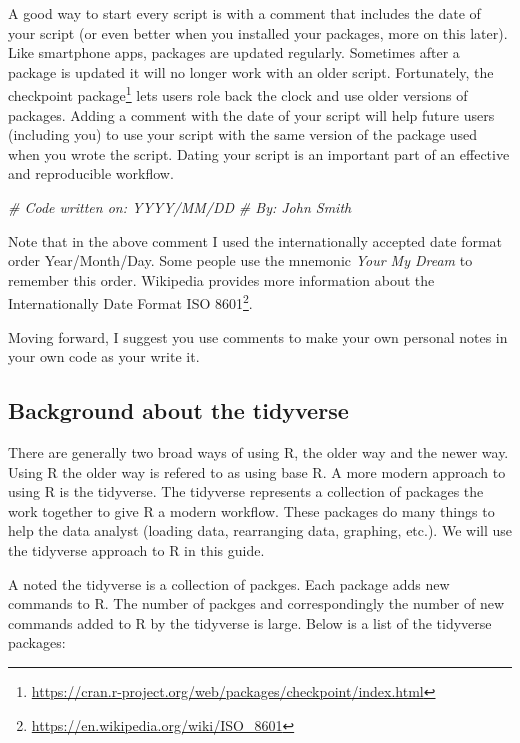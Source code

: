 \documentclass[
]{krantz}
\makeatletter
\newenvironment{Shaded}{\begin{snugshade}}{\end{snugshade}}
\newcommand{\CommentTok}[1]{\textcolor[rgb]{0.37,0.37,0.37}{\textit{#1}}}
\renewcommand{\href}[2]{#2\footnote{\url{#1}}}
\newenvironment{kframe}{%
\medskip{}
\setlength{\fboxsep}{.8em}
 \def\at@end@of@kframe{}%
 \ifinner\ifhmode%
  \def\at@end@of@kframe{\end{minipage}}%
  \begin{minipage}{\columnwidth}%
 \fi\fi%
 \def\FrameCommand##1{\hskip\@totalleftmargin \hskip-\fboxsep
 \colorbox{shadecolor}{##1}\hskip-\fboxsep
     \hskip-\linewidth \hskip-\@totalleftmargin \hskip\columnwidth}%
 \MakeFramed {\advance\hsize-\width
   \@totalleftmargin\z@ \linewidth\hsize
   \@setminipage}}%
 {\par\unskip\endMakeFramed%
 \at@end@of@kframe}
\renewenvironment{Shaded}{\begin{kframe}}{\end{kframe}}
\makeatother
\begin{document}
A good way to start every script is with a comment that includes the date of your script (or even better when you installed your packages, more on this later). Like smartphone apps, packages are updated regularly. Sometimes after a package is updated it will no longer work with an older script. Fortunately, the \href{https://cran.r-project.org/web/packages/checkpoint/index.html}{checkpoint package} lets users role back the clock and use older versions of packages. Adding a comment with the date of your script will help future users (including you) to use your script with the same version of the package used when you wrote the script. Dating your script is an important part of an effective and reproducible workflow.

\begin{Shaded}
\begin{Highlighting}[]
\CommentTok{# Code written on: YYYY/MM/DD }
\CommentTok{# By: John Smith}
\end{Highlighting}
\end{Shaded}

Note that in the above comment I used the internationally accepted date format order Year/Month/Day. Some people use the mnemonic \emph{Your My Dream} to remember this order. Wikipedia provides more information about the \href{https://en.wikipedia.org/wiki/ISO_8601}{Internationally Date Format ISO 8601}.

Moving forward, I suggest you use comments to make your own personal notes in your own code as your write it.

\hypertarget{background-about-the-tidyverse}{%
\subsection{Background about the tidyverse}\label{background-about-the-tidyverse}}

There are generally two broad ways of using R, the older way and the newer way. Using R the older way is refered to as using base R. A more modern approach to using R is the tidyverse. The tidyverse represents a collection of packages the work together to give R a modern workflow. These packages do many things to help the data analyst (loading data, rearranging data, graphing, etc.). We will use the tidyverse approach to R in this guide.

A noted the tidyverse is a collection of packges. Each package adds new commands to R. The number of packges and correspondingly the number of new commands added to R by the tidyverse is large. Below is a list of the tidyverse packages:
\end{document}
